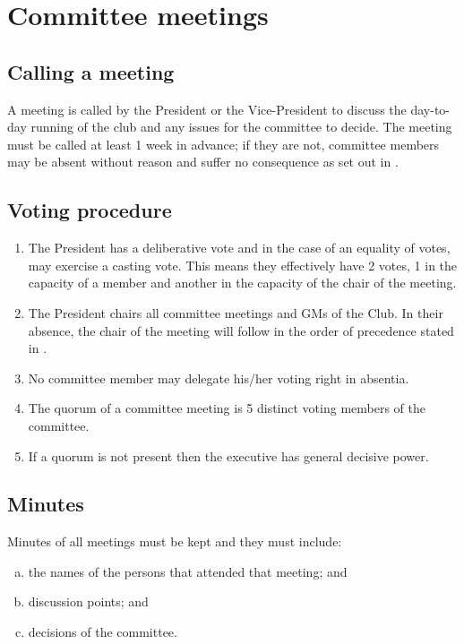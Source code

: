 \documentclass{constitution}
\begin{document}
\section{Committee meetings}\label{committeeMeetings}

\subsection{Calling a meeting}
A meeting is called by the President or the Vice-President to discuss the day-to-day running of the club and any issues for the committee to decide. The meeting must be called at least 1 week in advance; if they are not, committee members may be absent without reason and suffer no consequence as set out in .

\subsection{Voting procedure}\label{committeeMeetingVotingProcedure}
\begin{enumerate}[(1)]
    \item The President has a deliberative vote and in the case of an equality of votes, may exercise a casting vote. This means they effectively have 2 votes, 1 in the capacity of a member and another in the capacity of the chair of the meeting.
    \item The President chairs all committee meetings and GMs of the Club. In their absence, the chair of the meeting will follow in the order of precedence stated in .
    \item No committee member may delegate his/her voting right in absentia.
    \item The quorum of a committee meeting is 5 distinct voting members of the committee.
    \item If a quorum is not present then the executive has general decisive power.
\end{enumerate}

\subsection{Minutes}
Minutes of all meetings must be kept and they must include:
\begin{enumerate}[(a)]
    \item the names of the persons that attended that meeting; and
    \item discussion points; and
    \item decisions of the committee.
\end{enumerate}
\end{document}
